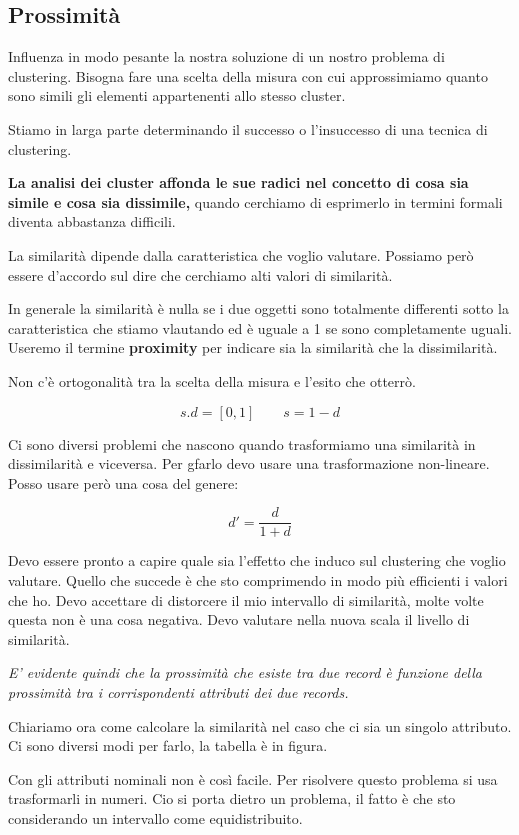 \documentclass[12pt, a4paper,titlepage,openany]{article}
\begin{document}
\subsection{Prossimità}

Influenza in modo pesante la nostra soluzione di un nostro problema di clustering. Bisogna fare una scelta della misura con cui approssimiamo quanto sono simili gli elementi appartenenti allo stesso cluster.

Stiamo in larga parte determinando il successo o l'insuccesso di una tecnica di clustering.

\textbf{La analisi dei cluster affonda le sue radici nel concetto di cosa sia simile e cosa sia dissimile,} quando cerchiamo di esprimerlo in termini formali diventa abbastanza difficili.

La similarità dipende dalla caratteristica che voglio valutare. Possiamo però essere d'accordo sul dire che cerchiamo alti valori di similarità.

In generale la similarità è nulla se i due oggetti sono totalmente differenti sotto la caratteristica che stiamo vlautando ed è uguale a 1 se sono completamente uguali. Useremo il termine \textbf{proximity} per indicare sia la similarità che la dissimilarità. 

Non c'è ortogonalità tra la scelta della misura e l'esito che otterrò.

\[ s.d = [0, 1]   \qquad s =  1-d\]

Ci sono diversi problemi che nascono quando trasformiamo una similarità in dissimilarità e viceversa. Per gfarlo devo usare una trasformazione non-lineare. Posso usare però una cosa del genere:

\[ d' = \frac{d}{1+d}\]

Devo essere pronto a capire quale sia l'effetto che induco sul clustering che voglio valutare. Quello che succede è che sto comprimendo in modo più efficienti i valori che ho. Devo accettare di distorcere il mio intervallo di similarità, molte volte questa non è una cosa negativa. Devo valutare nella nuova scala il livello di similarità.

\textit{E' evidente quindi che la prossimità che esiste tra due record è funzione della prossimità tra i corrispondenti attributi dei due records.}

Chiariamo ora come calcolare la similarità nel caso che ci sia un singolo attributo. Ci sono diversi modi per farlo, la tabella è in figura.

Con gli attributi nominali non è così facile. Per risolvere questo problema si usa trasformarli in numeri. Cio si porta dietro un problema, il fatto è che sto considerando un intervallo come equidistribuito.
\end{document}
